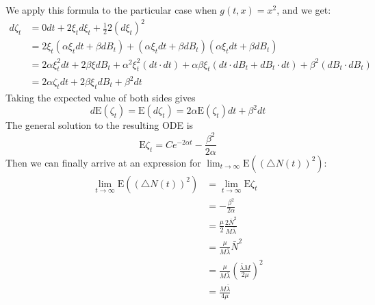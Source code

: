 \documentclass[titlepage]{article}
\newcommand{\E}{\textrm{E}}
\begin{document}
We apply this formula to the particular case when $g(t,x) = x^2$, and we get:
\begin{align*}
d \zeta_t &= 0 dt + 2 \xi_t d \xi_t + \frac{1}{2} 2 (d \xi_t)^2 \\
&= 2 \xi_t (\alpha \xi_t dt + \beta dB_t) + (\alpha \xi_t dt + \beta dB_t)(\alpha \xi_t dt + \beta dB_t) \\
&= 2 \alpha \xi_t^2 dt + 2 \beta \xi dB_t + \alpha^2 \xi_t^2 (dt \cdotp dt) + \alpha \beta \xi_t (dt \cdotp dB_t + dB_t \cdotp dt) + \beta^2 (dB_t \cdot dB_t) \\
&= 2 \alpha \zeta_t dt + 2 \beta \xi_t dB_t + \beta^2 dt
\end{align*}
Taking the expected value of both sides gives
\begin{equation*}
d \E( \zeta_t ) = \E( d \zeta_t )
= 2 \alpha \E( \zeta_t )dt + \beta^2 dt
\end{equation*}
The general solution to the resulting ODE is
\begin{equation*}
\E \zeta_t = C e^{-2\alpha t} - \frac{\beta^2}{2\alpha}
\end{equation*}
Then we can finally arrive at an expression for $\lim_{t \rightarrow \infty} \E( (\triangle N(t))^2 )$:
\begin{align*}
\lim_{t \rightarrow \infty} \E( (\triangle N(t))^2 )
&= \lim_{t \rightarrow \infty} \E \zeta_t \\
&= - \frac{\beta^2}{2\alpha} \\
&= \frac{\mu}{2}\frac{2\bar{N}^2}{M\bar\lambda} \\
&= \frac{\mu}{M\bar\lambda} \bar{N}^2 \\
&= \frac{\mu}{M\bar\lambda} \left( \frac{\bar\lambda M}{2\mu} \right)^2 \\
&= \frac{M\bar\lambda}{4\mu}
\end{align*}


\end{document}
